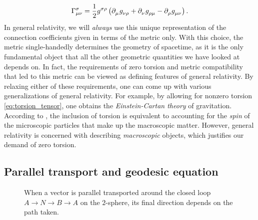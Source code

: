 \begin{equation}
	\Gamma^\sigma_{\mu \nu} = \frac{1}{2} g\indices{^\sigma^\rho} \left(
		\partial\indices{_\mu} g\indices{_\nu_\rho} +
		\partial\indices{_\nu} g\indices{_\rho_\mu} -
		\partial\indices{_\rho} g\indices{_\mu_\nu}
	\right) .
	\label{eq:def_christoffel}
\end{equation}
In general relativity, we will \emph{always} use this unique representation of the connection coefficients given in terms of the metric only.
With this choice, the metric single-handedly determines the geometry of spacetime, as it is the only fundamental object that all the other geometric quantities we have looked at depends on.
In fact, the requirements of zero torsion and metric compatibility that led to this metric can be viewed as defining features of general relativity.
By relaxing either of these requirements, one can come up with various generalizations of general relativity.
For example, by allowing for nonzero torsion \eqref{eq:torsion_tensor}, one obtains the \emph{Einstein-Cartan theory} of gravitation.
According to \cite{ref:hehl}, the inclusion of torsion is equivalent to accounting for the \emph{spin} of the microscopic particles that make up the macroscopic matter.
However, general relativity is concerned with describing \emph{macroscopic} objects, which justifies our demand of zero torsion.

\iffalse
\begin{align}
	\nabla_c T\indices{^{a_1 \ldots a_r}_{b_1 \ldots b_s}} &= \partial_c {T^{a_1 \ldots a_r}}_{b_1 \ldots b_s} \\
	                                                       &+ \Gamma^{a_1}_{dc} T\indices{^{d a_2 \ldots a_r}_{b_1 \ldots b_s}} + \dots + \Gamma^{a_r}_{dc} T\indices{^{a_1 \ldots a_{r-1}d}_{b_1 \ldots b_s}} \\
	                                                       &- {\Gamma^d}_{b_1 c} {T^{a_1 \ldots a_r}}_{d b_2 \ldots b_s} - \cdots - {\Gamma^d}_{b_s c} {T^{a_1 \ldots a_r}}_{b_1 \ldots b_{s-1} d}.
	\label{eq:def_cov_deriv}
\end{align}
\fi

\subsection{Parallel transport and geodesic equation}
\label{sec:geodesic}

\begin{figure}
\centering

\caption{\label{fig:parallel_transport}%
	When a vector is parallel transported around the closed loop $A \rightarrow N \rightarrow B \rightarrow A$ on the $2$-sphere, its final direction depends on the path taken.
}
\end{figure}

